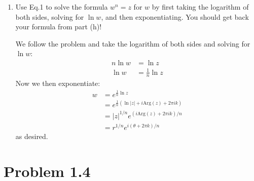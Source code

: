 \documentclass[10pt]{article}
\newcommand{\Arg}{\mathrm{Arg}}
\begin{document}
	 \begin{enumerate}[label=\alph*), resume]
	 	\item Use Eq.1 to solve the formula $w^n = z$ for $w$ by first taking the logarithm of both sides, 
			solving for $\ln w$, and then exponentiating. You should get back your formula from part (h)!

			\begin{solution}
				We follow the problem and take the logarithm of both sides and solving for $\ln w$:
				\begin{align*}
					n \ln w &=  \ln z \\
					\ln w &= \frac{1}{n} \ln z
				\end{align*}
				Now we then exponentiate:
				\begin{align*}
					w &= e^{\frac{1}{n}\ln z}\\
					  &=  e^{\frac{1}{n}(\ln |z| + i \Arg(z) + 2 \pi i k)} \\
					  &= |z|^{1/n} e^{(i \Arg(z) + 2 \pi i k) / n} \\
					  &= r^{1 / n}e^{i(\theta + 2 \pi k) / n}
				\end{align*}
				as desired. 
			\end{solution}
	 \end{enumerate}
	 \pagebreak
	 \section*{Problem 1.4}
\end{document}
